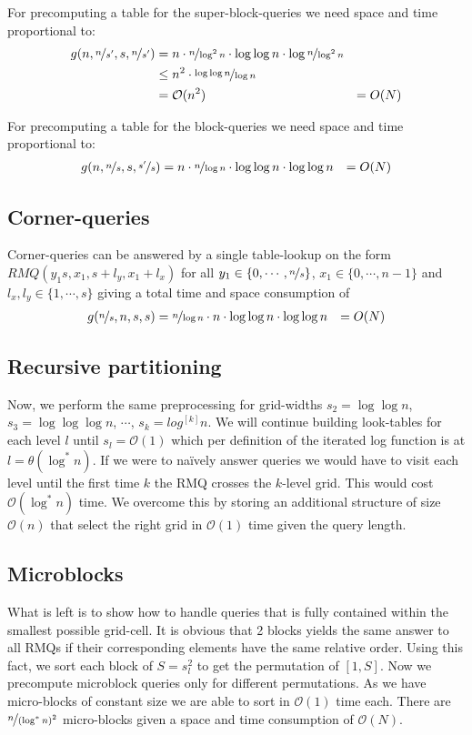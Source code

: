 \documentclass[a4paper,oneside,article,11pt]{memoir}
\begin{document}
For precomputing a table for the super-block-queries we need space and time proportional to:
\begin{align}
g(n, \nicefrac{n}{s'}, s, \nicefrac{n}{s'}) &= n \cdot \nicefrac{n}{\log^2 n} \cdot \log \log n \cdot \log \nicefrac{n}{\log^2 n} \\ &\leq n^2 \cdot \nicefrac{\log \log n}{\log n} \\ &= \mathcal{O}(n^2) &= O(N)
\end{align}

For precomputing a table for the block-queries we need space and time proportional to:
\begin{align}
g(n, \nicefrac{n}{s}, s, \nicefrac{s'}{s}) &= n \cdot \nicefrac{n}{\log n} \cdot \log \log n \cdot \log \log n &= O(N)
\end{align}

\subsection{Corner-queries}
Corner-queries can be answered by a single table-lookup on the form \\ $RMQ(y_1s,x_1,s+l_y,x_1+l_x)$ for all $y_1 \in \{0,\cdots,\nicefrac{n}{s} \}$, $x_1 \in \{0, \cdots, n-1 \}$ and $l_x,l_y \in \{1, \cdots, s \}$ giving a total time and space consumption of
\begin{align}
g(\nicefrac{n}{s}, n, s, s) &= \nicefrac{n}{\log n} \cdot n \cdot \log \log n \cdot \log \log n &= O(N)
\end{align}

\subsection{Recursive partitioning}
Now, we perform the same preprocessing for grid-widths $s_2 = \log \log n$, $s_3 = \log \log \log n$, $\cdots$, $s_k = log^{[k]} n$. We will continue building look-tables for each level $l$ until $s_l = \mathcal{O}(1)$ which per definition of the iterated log function is at $l = \theta(\log^* n)$. If we were to naïvely answer queries we would have to visit each level until the first time $k$ the RMQ crosses the $k$-level grid. This would cost $\mathcal{O}(\log^* n)$ time. We overcome this by storing an additional structure of size $\mathcal{O}(n)$ that select the right grid in $\mathcal{O}(1)$ time given the query length.

\subsection{Microblocks}
What is left is to show how to handle queries that is fully contained within the smallest possible grid-cell. It is obvious that 2 blocks yields the same answer to all RMQs if their corresponding elements have the same relative order. Using this fact, we sort each block of $S = s^2_l$ to get the permutation of $[1,S]$. Now we precompute microblock queries only for different permutations. As we have micro-blocks of constant size we are able to sort in $\mathcal{O}(1)$ time each. There are $\nicefrac{n}{(\log^* n)^2}$ micro-blocks given a space and time consumption of $\mathcal{O}(N)$.
\end{document}
